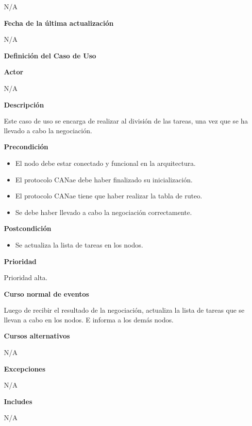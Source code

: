 N/A

\large\textbf{Fecha de la última actualización}
\vspace{3mm}

N/A

\Large\textbf{Definición del Caso de Uso}
\vspace{3mm}

\large\textbf{Actor}
\vspace{3mm}

N/A

\large\textbf{Descripción}
\vspace{3mm}

Este caso de uso se encarga de realizar al división de las tareas,
una vez que se ha llevado a cabo la negociación.

\large\textbf{Precondición}
\begin{itemize}
\item El nodo debe estar conectado y funcional en la arquitectura.
\item El protocolo CANae debe haber finalizado su inicialización.
\item El protocolo CANae tiene que haber realizar la tabla de ruteo.
\item Se debe haber llevado a cabo la negociación correctamente.
\end{itemize}

\large\textbf{Postcondición}
\begin{itemize}
  \item Se actualiza la lista de tareas en los nodos.
\end{itemize}
\large\textbf{Prioridad}
\vspace{3mm}

Prioridad alta.

\large\textbf{Curso normal de eventos}
\vspace{3mm}

Luego de recibir el resultado de la negociación, actualiza la lista
de tareas que se llevan a cabo en los nodos. E informa a los demás nodos.

\large\textbf{Cursos alternativos}
\vspace{3mm}

N/A

\large\textbf{Excepciones}
\vspace{3mm}

N/A

\large\textbf{Includes}
\vspace{3mm}

N/A

